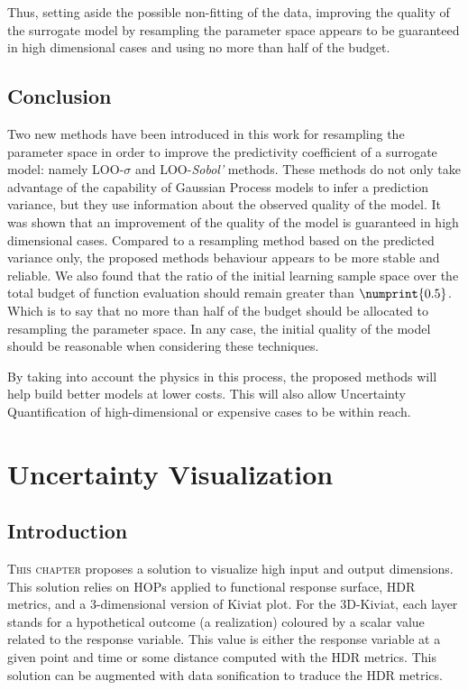 Thus, setting aside the possible non-fitting of the data, improving the quality of the surrogate model by resampling the parameter space appears to be guaranteed in high dimensional cases and using no more than half of the budget.


\section{Conclusion}

Two new methods have been introduced in this work for resampling the parameter space in order to improve the predictivity coefficient of a surrogate model: namely LOO-$\sigma$ and LOO-\textit{Sobol'} methods. These methods do not only take advantage of the capability of Gaussian Process models to infer a prediction variance, but they use information about the observed quality of the model. It was shown that an improvement of the quality of the model is guaranteed in high dimensional cases. Compared to a resampling method based on the predicted variance only, the proposed methods behaviour appears to be more stable and reliable. We also found that the ratio of the initial learning sample space over the total budget of function evaluation should remain greater than $\numprint{0.5}$. Which is to say that no more than half of the budget should be allocated to resampling the parameter space. In any case, the initial quality of the model should be reasonable when considering these techniques.

By taking into account the physics in this process, the proposed methods will help build better models at lower costs. This will also allow Uncertainty Quantification of high-dimensional or expensive cases to be within reach.

\chapter{Uncertainty Visualization}\label{chap:visu}

\section{Introduction}

\lettrine{T}{his chapter} proposes a solution to visualize high input and output dimensions. This solution relies on HOPs applied to functional response surface, HDR metrics,  and a 3-dimensional version of Kiviat plot. For the 3D-Kiviat, each layer stands for a hypothetical outcome (a realization) coloured by a scalar value related to the response variable. This value is either the response variable at a given point and time or some distance computed with the HDR metrics. This solution can be augmented with data sonification to traduce the HDR metrics.

